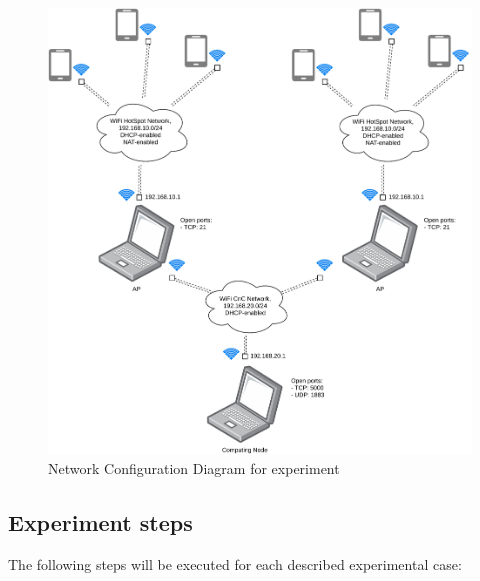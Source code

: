 \begin{figure}[H]
	\centering
	\includegraphics[width=\linewidth, keepaspectratio]{images/Deployment Diagram-Network_Diagram.pdf}
\caption{Network Configuration Diagram for experiment}
\label{fig:network-diagram}
\end{figure}

\subsection{Experiment steps}\label{experiment-steps}

The following steps will be executed for each described experimental
case:

